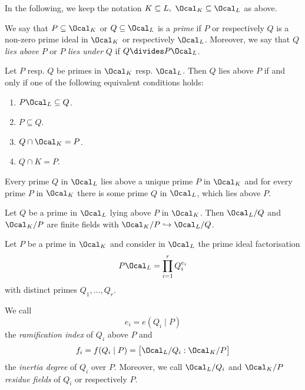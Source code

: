\begin{notat*}
	In the following, we keep the notation \( K \subseteq L,\ \Ocal_K \subseteq \Ocal_L \) as above.
\end{notat*}

\begin{defn*}[Primes]
	We say that \( P \subseteq \Ocal_K \) or \( Q \subseteq \Ocal_L \) is a \emph{prime} if \( P \) or respectively \( Q \) is a non-zero prime ideal in \( \Ocal_K \) or respectively \( \Ocal_L \).
	Moreover, we say that \( Q \) \emph{lies above} \( P \) or \( P \) \emph{lies under} \( Q \) if \( Q \divides P\Ocal_L \).
\end{defn*}

\begin{lem}
	Let \( P \) resp. \( Q \) be primes in \( \Ocal_K \) resp. \( \Ocal_L \).
	Then \( Q \) lies above \( P \) if and only if one of the following equivalent conditions holds:
	\begin{enumerate}
		\item \( P \Ocal_L \subseteq Q \).
		\item \( P \subseteq Q \).
		\item \( Q \cap \Ocal_K = P \).
		\item \( Q \cap K = P \).
	\end{enumerate}
\end{lem}

\begin{thmn}
	Every prime \( Q \) in \( \Ocal_L \) lies above a unique prime \( P \) in \( \Ocal_K \) and for every prime \( P \) in \( \Ocal_K \) there is some prime \( Q \) in \( \Ocal_L \), which lies above \( P \).
\end{thmn}

\begin{lem}
	Let \( Q \) be a prime in \( \Ocal_L \) lying above \( P \) in \( \Ocal_K \).
	Then \( \Ocal_L/Q \) and \( \Ocal_K/P \) are finite fields with \( \Ocal_K/P \hookrightarrow \Ocal_L/Q \).
\end{lem}

Let \( P \) be a prime in \( \Ocal_K \) and consider in \( \Ocal_L \) the prime ideal factorisation
\[ P\Ocal_L = \prod_{i=1}^{r} Q_i^{e_i} \]
with distinct primes \( Q_1, \dotsc, Q_r \).

\begin{defn*}
	We call
	\[ e_i = e(Q_i \mid P) \]
	the \emph{ramification index} of \( Q_i \) above \( P \) and 
	\[ f_i = f(Q_i \mid P) = \big[ \Ocal_L/Q_i : \Ocal_K/P \big] \]
	the \emph{inertia degree} of \( Q_i \) over \( P \).
	Moreover, we call \( \Ocal_L/Q_i \) and \( \Ocal_K/P \) \emph{residue fields} of \( Q_i \) or respectively \( P \).
\end{defn*}


